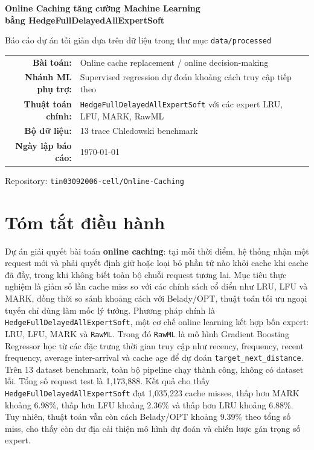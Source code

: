 \documentclass[11pt,a4paper]{article}
\newcommand{\code}[1]{\texttt{#1}}
\newcommand{\hedge}{\code{HedgeFullDelayedAllExpertSoft}}
\newcommand{\rawml}{\code{RawML}}
\begin{document}
\begin{titlepage}
    \centering
    \vspace*{2.5cm}
    {\Huge\bfseries\sffamily Online Caching tăng cường Machine Learning\\[0.25cm]
    bằng HedgeFullDelayedAllExpertSoft\par}
    \vspace{0.8cm}
    {\large Báo cáo dự án tối giản dựa trên dữ liệu trong thư mục \code{data/processed}\par}
    \vspace{1.5cm}
    \begin{tabular}{rl}
        \textbf{Bài toán:} & Online cache replacement / online decision-making \\
        \textbf{Nhánh ML phụ trợ:} & Supervised regression dự đoán khoảng cách truy cập tiếp theo \\
        \textbf{Thuật toán chính:} & \hedge{} với các expert LRU, LFU, MARK, RawML \\
        \textbf{Bộ dữ liệu:} & 13 trace Chledowski benchmark \\
        \textbf{Ngày lập báo cáo:} & \today
    \end{tabular}

    \vfill
    {\small Repository: \code{tin03092006-cell/Online-Caching}}
\end{titlepage}

\section*{Tóm tắt điều hành}

Dự án giải quyết bài toán \textbf{online caching}: tại mỗi thời điểm, hệ thống nhận một request mới và phải quyết định giữ hoặc loại bỏ phần tử nào khỏi cache khi cache đã đầy, trong khi không biết toàn bộ chuỗi request tương lai. Mục tiêu thực nghiệm là giảm số lần cache miss so với các chính sách cổ điển như LRU, LFU và MARK, đồng thời so sánh khoảng cách với Belady/OPT, thuật toán tối ưu ngoại tuyến chỉ dùng làm mốc lý tưởng. Phương pháp chính là \hedge{}, một cơ chế online learning kết hợp bốn expert: LRU, LFU, MARK và \rawml{}. Trong đó \rawml{} là mô hình Gradient Boosting Regressor học từ các đặc trưng thời gian truy cập như recency, frequency, recent frequency, average inter-arrival và cache age để dự đoán \code{target\_next\_distance}. Trên 13 dataset benchmark, toàn bộ pipeline chạy thành công, không có dataset lỗi. Tổng số request test là 1,173,888. Kết quả cho thấy \hedge{} đạt 1,035,223 cache misses, thấp hơn MARK khoảng 6.98\%, thấp hơn LFU khoảng 2.36\% và thấp hơn LRU khoảng 6.88\%. Tuy nhiên, thuật toán vẫn còn cách Belady/OPT khoảng 9.39\% theo tổng số miss, cho thấy còn dư địa cải thiện mô hình dự đoán và chiến lược gán trọng số expert.
\end{document}
